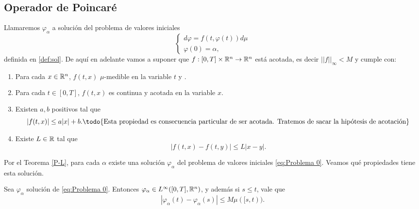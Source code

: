  	
 	
 	
 	




 \subsection{Operador de Poincaré} 
Llamaremos $\varphi_\alpha$ a solución  del problema de valores iniciales
 \begin{equation}
 	\left\lbrace \begin{array}{l}
 		d\varphi=f(t,\varphi(t))d\mu\\
 		\varphi(0)=\alpha,
 	\end{array}\right. \label{eq:Problema 0}
 \end{equation}
definida en \ref{def:sol}. De aquí  en adelante vamos a suponer que  $f:[0,T]\times\mathbb{R}^n\to\mathbb{R}^n$ está acotada, es decir $||f||_\infty<M$ y cumple con:
 \begin{enumerate}[label=\upshape(P-\arabic*),ref= (P-\arabic*)]
 	\item \label{pm1} Para cada $x\in\mathbb{R}^n$, $f(t,x)$  $\mu$-medible en la variable $t$ y .
 	\item \label{pm2} Para cada $t\in[0,T]$, $f(t,x)$ es continua y acotada en la variable $x$.
 	\item \label{pm3} Existen $a,b$ positivos tal que
 	$$|f(t,x)|\leq a|x|+b.\textrm{\todo{Esta propiedad es consecuencia particular de ser acotada. Tratemos de sacar la hipótesis de acotación}}$$ 
 	\item \label{pm4}Existe $L\in\mathbb{R}$ tal que $$\left| f(t,x)-f(t,y)\right|\leq L\left| x-y \right| . $$
 \end{enumerate} 
 Por el Teorema \ref{P-L}, para cada $\alpha$ existe una solución $\varphi_\alpha$ del problema de valores iniciales \eqref{eq:Problema 0}. Veamos qué propiedades tiene esta solución.
\begin{prop}
     Sea $\varphi_\alpha$ solución de  \eqref{eq:Problema 0}. Entonces $\varphi_{\alpha}\in L^\infty([0,T],\mathbb{R}^n)$, y además si $s\leq t$, vale que
    \begin{equation*}\label{acotación}
        \left| \varphi_\alpha(t)-\varphi_\alpha(s)\right|\leq M\mu([s,t)).
    \end{equation*}
\end{prop}
